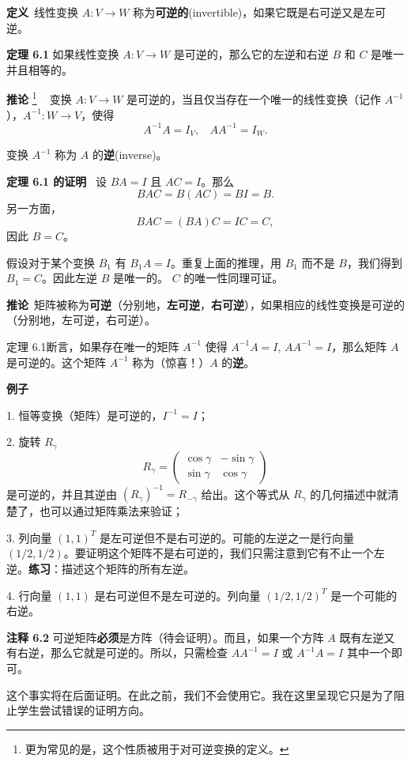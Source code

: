\textbf{定义}~线性变换 $A: V \to W$ 称为\textbf{可逆的}(invertible)，如果它既是右可逆又是左可逆。

\textbf{定理 6.1} 如果线性变换 $A: V \to W$ 是可逆的，那么它的左逆和右逆 $B$ 和 $C$ 是唯一并且相等的。

\textbf{推论}
\footnote{
更为常见的是，这个性质被用于对可逆变换的定义。
}
~ 变换 $A: V \to W$ 是可逆的，当且仅当存在一个唯一的线性变换（记作 $A^{-1}$），$A^{-1}: W \to V$，使得 $$A^{-1} A = I_V,~~~~A A^{-1} = I_W.$$

变换 $A^{-1}$ 称为 $A$ 的\textbf{逆}(inverse)。

\textbf{定理 6.1 的证明} ~设 $BA = I$ 且 $AC = I$。那么 
$$BAC = B(AC) = BI = B.$$
另一方面，
$$BAC = (BA)C = IC = C,$$
因此 $B = C$。

假设对于某个变换 $B_1$ 有 $B_1 A = I$。重复上面的推理，用 $B_1$ 而不是 $B$，我们得到 $B_1 = C$。因此左逆 $B$ 是唯一的。 $C$ 的唯一性同理可证。

\textbf{推论}~矩阵被称为\textbf{可逆}（分别地，\textbf{左可逆}，\textbf{右可逆}），如果相应的线性变换是可逆的（分别地，左可逆，右可逆）。

定理 6.1断言，如果存在唯一的矩阵 $A^{-1}$ 使得 $A^{-1} A = I$, $A A^{-1} = I$，那么矩阵 $A$ 是可逆的。这个矩阵 $A^{-1}$ 称为（惊喜！）$A$ 的\textbf{逆}。

\textbf{例子}~

1. 恒等变换（矩阵）是可逆的，$I^{-1} = I$；

2. 旋转 $R_\gamma$ 
$$R_\gamma = \begin{pmatrix} \cos \gamma & -\sin \gamma \\ \sin \gamma & \cos \gamma \end{pmatrix}$$
是可逆的，并且其逆由 $(R_\gamma)^{-1} = R_{-\gamma}$ 给出。这个等式从 $R_\gamma$ 的几何描述中就清楚了，也可以通过矩阵乘法来验证；

3. 列向量 $(1, 1)^T$ 是左可逆但不是右可逆的。可能的左逆之一是行向量 $(1/2, 1/2)$。要证明这个矩阵不是右可逆的，我们只需注意到它有不止一个左逆。\textbf{练习}：描述这个矩阵的所有左逆。

4. 行向量 $(1, 1)$ 是右可逆但不是左可逆的。列向量 $(1/2, 1/2)^T$ 是一个可能的右逆。

\textbf{注释 6.2} 可逆矩阵\textbf{必须}是方阵（待会证明）。而且，如果一个方阵 $A$ 既有左逆又有右逆，那么它就是可逆的。所以，只需检查 $A A^{-1} = I$ 或 $A^{-1} A = I$ 其中一个即可。

这个事实将在后面证明。在此之前，我们不会使用它。我在这里呈现它只是为了阻止学生尝试错误的证明方向。

